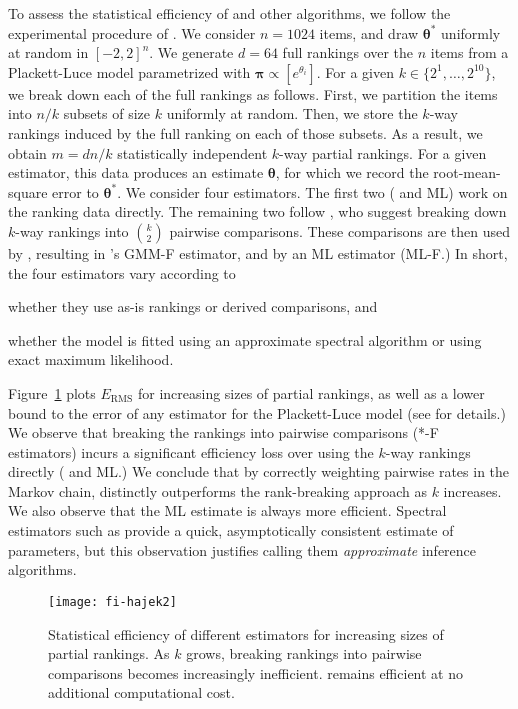 To assess the statistical efficiency of \LSR{} and other algorithms, we follow the experimental procedure of \citet{hajek2014minimax}.
We consider $n = 1024$ items, and draw $\bm{\theta}^*$ uniformly at random in $[-2, 2]^n$.
We generate $d = 64$ full rankings over the $n$ items from a Plackett-Luce model parametrized with $\bm{\pi} \propto [e^{\theta_i}]$.
For a given $k \in \{2^1, \ldots, 2^{10}\}$, we break down each of the full rankings as follows.
First, we partition the items into $n/k$ subsets of size $k$ uniformly at random.
Then, we store the $k$-way rankings induced by the full ranking on each of those subsets.
As a result, we obtain $m = dn/k$ statistically independent $k$-way partial rankings.
For a given estimator, this data produces an estimate $\bm{\theta}$, for which we record the root-mean-square error to $\bm{\theta}^*$.
We consider four estimators.
The first two (\LSR{} and ML) work on the ranking data directly.
The remaining two follow \citet{azari2013generalized}, who suggest breaking down $k$-way rankings into $\binom{k}{2}$ pairwise comparisons.
These comparisons are then used by \LSR{}, resulting in \citeauthor{azari2013generalized}'s GMM-F estimator, and by an ML estimator (ML-F.)
In short, the four estimators vary according to
\begin{enuminline}
\item whether they use as-is rankings or derived comparisons, and
\item whether the model is fitted using an approximate spectral algorithm or using exact maximum likelihood.
\end{enuminline}
Figure~\ref{fi:fig:efficiency} plots $E_{\text{RMS}}$ for increasing sizes of partial rankings, as well as a lower bound to the error of any estimator for the Plackett-Luce model (see \citet{hajek2014minimax} for details.)
We observe that breaking the rankings into pairwise comparisons (*-F estimators) incurs a significant efficiency loss over using the $k$-way rankings directly (\LSR{} and ML.)
We conclude that by correctly weighting pairwise rates in the Markov chain, \LSR{} distinctly outperforms the rank-breaking approach as $k$ increases.
We also observe that the ML estimate is always more efficient.
Spectral estimators such as \LSR{} provide a quick, asymptotically consistent estimate of parameters, but this observation justifies calling them \emph{approximate} inference algorithms.


\begin{figure}[ht]
\centering
\texttt{[image: fi-hajek2]}
\vskip -0.1in
\caption{
Statistical efficiency of different estimators for increasing sizes of partial rankings.
As $k$ grows, breaking rankings into pairwise comparisons becomes increasingly inefficient.
\LSR{} remains efficient at no additional computational cost.
}
\vskip -0.1in
\label{fi:fig:efficiency}
\end{figure}

